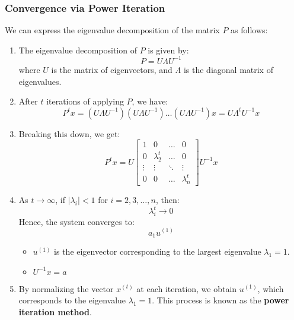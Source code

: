 \subsubsection{Convergence via Power Iteration}
\begin{definition}
    We can express the eigenvalue decomposition of the matrix $P$ as follows:

    \begin{enumerate}
        \item The eigenvalue decomposition of $P$ is given by:
        \[
        P = U \Lambda U^{-1}
        \]
        where $U$ is the matrix of eigenvectors, and $\Lambda$ is the diagonal matrix of eigenvalues.

        \item After $t$ iterations of applying $P$, we have:
        \[
        P^t x = (U \Lambda U^{-1})(U \Lambda U^{-1}) \dots (U \Lambda U^{-1}) x = U \Lambda^t U^{-1} x
        \]

        \item Breaking this down, we get:
        \[
        P^t x = U \begin{bmatrix}
        1 & 0 & \dots & 0 \\
        0 & \lambda_2^t & \dots & 0 \\
        \vdots & \vdots & \ddots & \vdots \\
        0 & 0 & \dots & \lambda_n^t
        \end{bmatrix} U^{-1} x
        \]

        \item As $t \to \infty$, if $|\lambda_i| < 1$ for $i = 2, 3, \dots, n$, then:
        \[
        \lambda_i^t \to 0
        \]
        Hence, the system converges to:
        \[
        a_1 u^{(1)} 
        \]
        \begin{itemize}
            \item $u^{(1)}$ is the eigenvector corresponding to the largest eigenvalue $\lambda_1 = 1$.
            \item $U^{-1}x = a$ 
        \end{itemize}

        \item By normalizing the vector $x^{(t)}$ at each iteration, we obtain $u^{(1)}$, which corresponds to the eigenvalue $\lambda_1 = 1$. This process is known as the \textbf{power iteration method}.
    \end{enumerate}
\end{definition}



